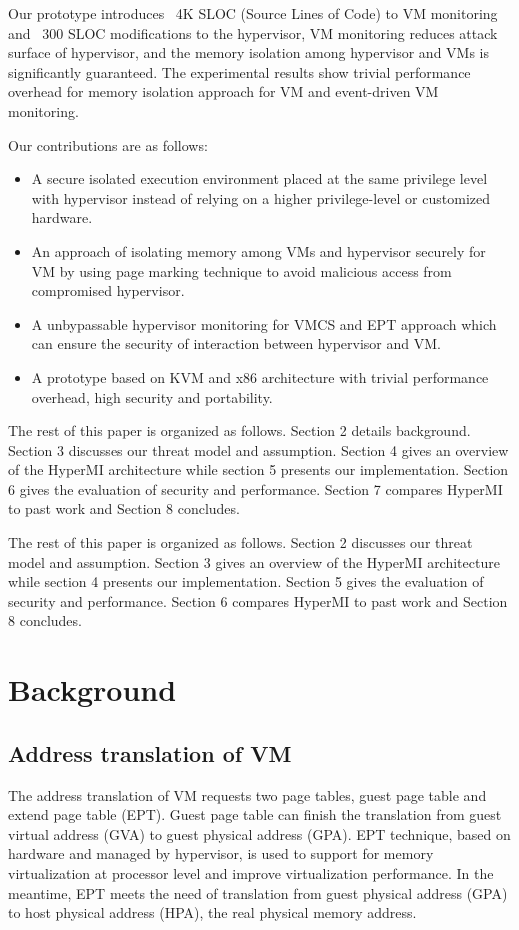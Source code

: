 \documentclass[conference]{IEEEtran}
\begin{document}
Our prototype introduces ~4K SLOC (Source Lines of Code) to VM monitoring and ~300 SLOC modifications to the hypervisor, VM monitoring reduces attack surface of hypervisor, and the memory isolation among hypervisor and VMs is significantly guaranteed. The experimental results show trivial performance overhead for memory isolation approach for VM and event-driven VM monitoring.


Our contributions are as follows:
\begin{itemize}
\item A secure isolated execution environment placed at the same privilege level with hypervisor instead of relying on a higher privilege-level or customized hardware.
\item{An approach of isolating memory among VMs and hypervisor securely for VM by using page marking technique to avoid malicious access from compromised hypervisor.}

\item{A unbypassable hypervisor monitoring for VMCS and EPT approach  which can ensure the security of interaction between hypervisor and VM.}

\item{A prototype based on KVM and x86 architecture with trivial performance overhead, high security and portability.}

\end{itemize}



The rest of this paper is organized as follows. Section 2 details background. Section 3 discusses our threat model and assumption. Section 4 gives an overview of the HyperMI architecture while section 5 presents our implementation. Section 6 gives the evaluation of security and performance. Section 7 compares HyperMI to past work and Section 8 concludes.

The rest of this paper is organized as follows. Section 2 discusses our threat model and assumption. Section 3 gives an overview of the HyperMI architecture while section 4 presents our implementation. Section 5 gives the evaluation of security and performance. Section 6 compares HyperMI to past work and Section 8 concludes.



\iffalse
\section{Background}
\subsection{Address translation of VM}
The address translation of VM requests two page tables, guest page table and extend page table (EPT). Guest page table can finish the translation from guest virtual address (GVA) to guest physical address (GPA). EPT technique, based on hardware and managed by hypervisor, is used to support for memory virtualization at processor level and improve virtualization performance. In the meantime, EPT meets the need of translation from guest physical address (GPA) to host physical address (HPA), the real physical memory address. 
\end{document}
